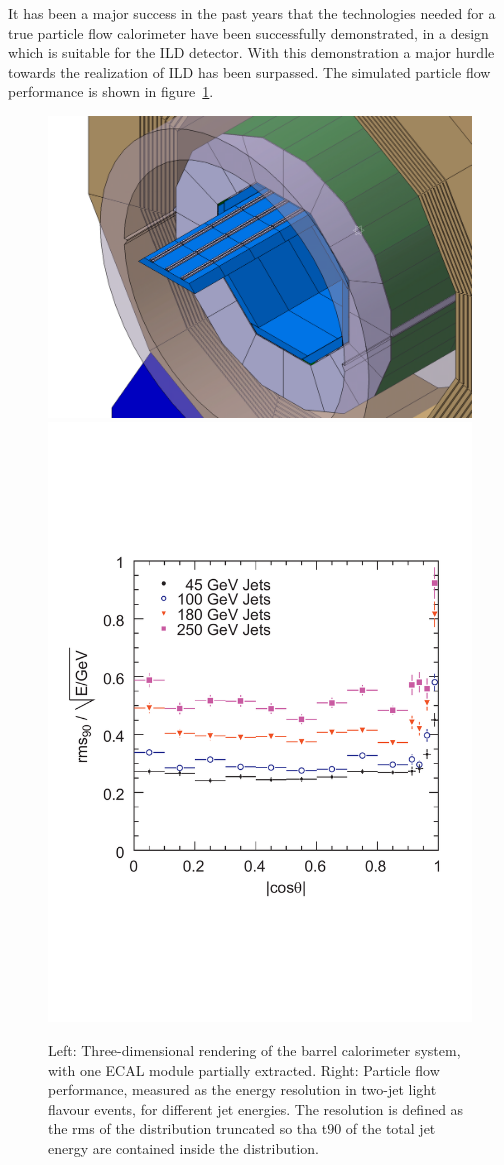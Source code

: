 \documentclass[%
 amsmath,amssymb,
 aps,
]{revtex4-1}
\begin{document}
It has been a major success in the past years that the technologies needed for a true particle flow calorimeter have been successfully demonstrated, in a design which is suitable for the ILD detector. With this demonstration a major hurdle towards the realization of ILD has been surpassed. The simulated particle flow performance is shown in figure~\ref{fig:pflow}.
\begin{figure}[th]
    \centering
    \includegraphics[width=0.45\hsize]{figures/ECal_insertion.jpg}
    \includegraphics[width=0.38\hsize]{figures/pflow.pdf}
    \caption{Left: Three-dimensional rendering of the barrel calorimeter system, with one ECAL module partially extracted. Right: Particle flow performance, measured as the energy resolution in two-jet light flavour events, for different jet energies. The resolution is defined as the rms of the distribution truncated so tha t$90$ of the total jet energy are contained inside the distribution.}
    \label{fig:pflow}
\end{figure}
\end{document}

